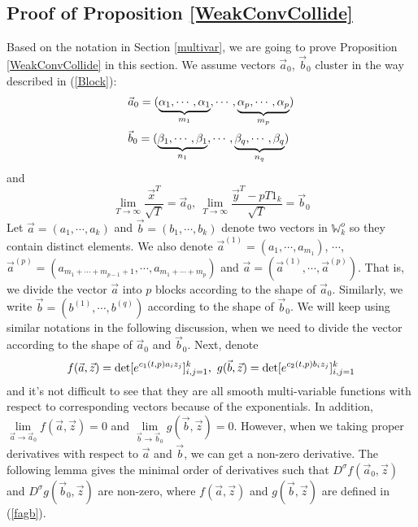 \subsection{Proof of Proposition \ref{WeakConvCollide}}{\label{ProofProp2}}
Based on the notation in Section \ref{multivar}, we are going to prove Proposition \ref{WeakConvCollide} in this section. We assume vectors $\vec{a}_{0}$, $\vec{b}_{0}$ cluster in the way described in (\ref{Block}):
\begin{equation}{\label{a0b0}}
\begin{split}
	&\vec{a}_{0}=(\underbrace{\alpha_{1},\cdots,\alpha_{1}}_{m_{1}},\cdots,\underbrace{\alpha_{p},\cdots,\alpha_{p}}_{m_{p}})\\
	&\vec{b}_{0}=(\underbrace{\beta_{1},\cdots,\beta_{1}}_{n_{1}},\cdots,\underbrace{\beta_{q},\cdots,\beta_{q}}_{n_{q}})
\end{split}
\end{equation}
and $$\lim_{T\rightarrow\infty}\frac{\vec{x}^{T}}{\sqrt{T}}=\vec{a}_0,\ \lim_{T\rightarrow\infty}\frac{\vec{y}^{T}-pT1_{k}}{\sqrt{T}}=\vec{b}_0$$
Let $\vec{a}=(a_{1},\cdots,a_{k})$ and $\vec{b}=(b_{1},\cdots,b_{k})$ denote two vectors in $\mathbb{W}_{k}^{o}$ so they contain distinct elements. We also denote $\vec{a}^{(1)}=(a_{1},\cdots,a_{m_1})$, $\cdots$, $\vec{a}^{(p)}=(a_{m_1+\cdots+m_{p-1}+1},\cdots, a_{m_1+\cdots+m_{p}})$ and $\vec{a}=(\vec{a}^{(1)},\cdots,\vec{a}^{(p)})$. That is, we divide the vector $\vec{a}$ into $p$ blocks according to the shape of $\vec{a}_0$. Similarly, we write $\vec{b}=(b^{(1)},\cdots,b^{(q)})$ according to the shape of $\vec{b}_0$. We will keep using similar notations in the following discussion, when we need to divide the vector according to the shape of $\vec{a}_0$ and $\vec{b}_0$. Next, denote
\begin{equation}{\label{fagb}}
	f(\vec{a},\vec{z})=\det[e^{c_1(t,p)a_{i}z_{j}}]_{i,j=1}^{k},\ g(\vec{b},\vec{z})=\det[e^{c_2(t,p)b_{i}z_{j}}]_{i,j=1}^{k}
\end{equation}
and it's not difficult to see that they are all smooth multi-variable functions with respect to corresponding vectors because of the exponentials. In addition, $\lim\limits_{\vec{a}\rightarrow\vec{a}_{0}}f(\vec{a},\vec{z})=0$ and $\lim\limits_{\vec{b}\rightarrow\vec{b}_{0}}g(\vec{b},\vec{z})=0$. However, when we taking proper derivatives with respect to $\vec{a}$ and $\vec{b}$, we can get a non-zero derivative. The following lemma gives the minimal order of derivatives such that $D^{\sigma}f(\vec{a}_0,\vec{z})$ and $D^{\sigma}g(\vec{b}_0,\vec{z})$ are non-zero, where $f(\vec{a},\vec{z})$ and $g(\vec{b},\vec{z})$ are defined in (\ref{fagb}).

